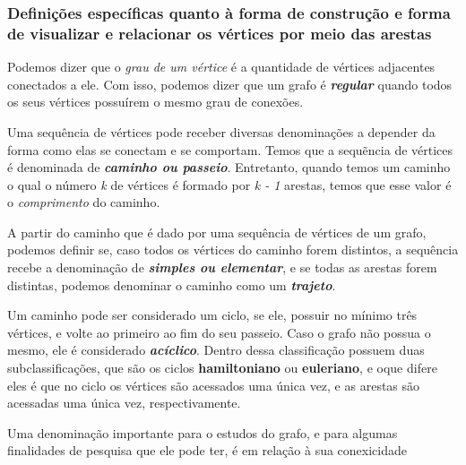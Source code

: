 \documentclass[12pt a4paper]{paper}
\begin{document}
\subsubsection{Definições específicas quanto à forma de construção e forma de visualizar e relacionar os vértices por meio das arestas} %
\label{sec:Definições específicas quanto à forma de construção e forma de visualizar e relacionar os vértices por meio das arestas}
Podemos dizer que o \textit{grau de um vértice} é a quantidade de vértices adjacentes conectados a ele. Com isso, podemos dizer que um grafo é \textbf{\textit{regular}} quando todos os seus vértices possuírem o mesmo grau de conexões.\par
Uma sequência de vértices pode receber diversas denominações a depender da forma como elas se conectam e se comportam. Temos que a sequẽncia de vértices é denominada de \textbf{\textit{caminho ou passeio}}. Entretanto, quando temos um caminho o qual o número \textit{k} de vértices é formado por \textit{k - 1} arestas, temos que esse valor é o \textit{comprimento} do caminho. \par
A partir do caminho que é dado por uma sequência de vértices de um grafo, podemos definir se, caso todos os vértices do caminho forem distintos, a sequência recebe a denominação de \textit{\textbf{simples ou elementar}}, e se todas as arestas forem distintas, podemos denominar o caminho como um \textbf{\textit{trajeto}}.\par
Um caminho pode ser considerado um ciclo, se ele, possuir no mínimo três vértices, e volte ao primeiro ao fim do seu passeio. Caso o grafo não possua o mesmo, ele é considerado \textbf{\textit{acíclico}}. Dentro dessa classificação possuem duas subclassificações, que são os ciclos \textbf{hamiltoniano} ou \textbf{euleriano}, e oque difere eles é que no ciclo os vértices são acessados uma única vez, e as arestas são acessadas uma única vez, respectivamente.\par %
Uma denominação importante para o estudos do grafo, e para algumas finalidades de pesquisa que ele pode ter, é em relação à sua conexicidade

\end{document}

